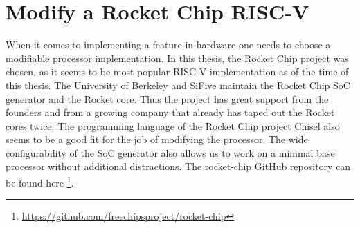 \chapter{Modify a Rocket Chip RISC-V}\label{chap:mod_risc-v}
When it comes to implementing a feature in hardware one
needs to choose a modifiable processor implementation.
In this thesis, the Rocket Chip project was chosen, as it
seems to be most popular RISC-V implementation as of the time of this thesis.
The University of Berkeley and SiFive maintain the Rocket
Chip SoC generator and the Rocket core. Thus the project has
great support from the founders
and from a growing company that already has taped out
the Rocket cores twice.
The programming language of the Rocket Chip project
Chisel also seems to be a good fit for the job of
modifying the processor. The wide configurability of
the SoC generator also allows us to work on a
minimal base processor without additional distractions.
The rocket-chip GitHub repository can be found here
\footnote{\url{https://github.com/freechipsproject/rocket-chip}}.


